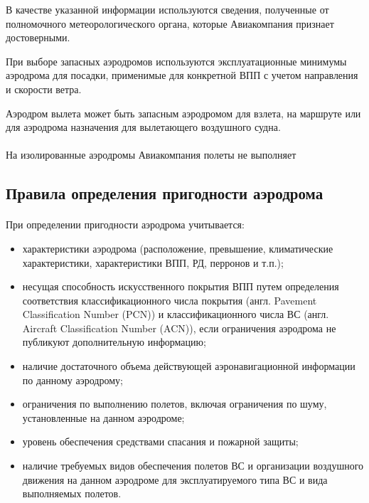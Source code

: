 В качестве указанной информации используются сведения, полученные от полномочного метеорологического органа, которые Авиакомпания признает достоверными.

При выборе запасных аэродромов используются эксплуатационные минимумы аэродрома для посадки, применимые для конкретной ВПП с учетом направления и скорости ветра.

Аэродром вылета может быть запасным аэродромом для взлета, на маршруте или для аэродрома назначения для вылетающего воздушного судна.

\paragraph{} На изолированные аэродромы Авиакомпания полеты не выполняет

\subsection{Правила определения пригодности аэродрома}

\paragraph{} При определении пригодности аэродрома учитывается:
\begin{itemize}
    \item характеристики аэродрома (расположение, превышение, климатические характеристики, характеристики ВПП, РД, перронов и т.п.);
    \item несущая способность искусственного покрытия ВПП путем определения соответствия классификационного числа покрытия (англ. Pavement Classification Number (PCN)) и классификационного числа ВС (англ. Aircraft Classification Number (ACN)), если ограничения аэродрома не публикуют дополнительную информацию;
    \item наличие достаточного объема действующей аэронавигационной информации по данному аэродрому;
    \item ограничения по выполнению полетов, включая ограничения по шуму, установленные на данном аэродроме;
    \item уровень обеспечения средствами спасания и пожарной защиты;
    \item наличие требуемых видов обеспечения полетов ВС и организации воздушного движения на данном аэродроме для эксплуатируемого типа ВС и вида выполняемых полетов.
\end{itemize}


